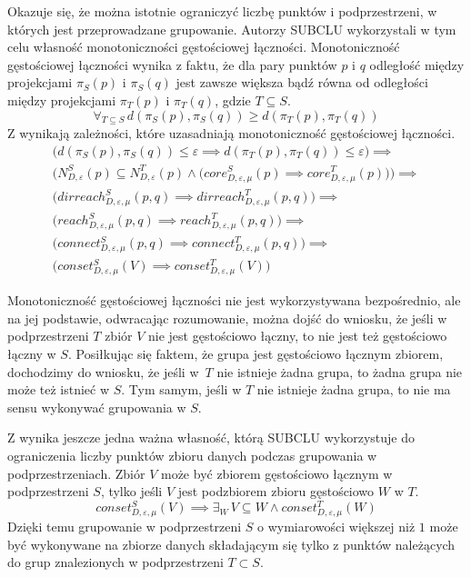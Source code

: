 Okazuje się, że można istotnie ograniczyć liczbę punktów i podprzestrzeni, w których jest przeprowadzane grupowanie. Autorzy SUBCLU wykorzystali w tym celu własność monotoniczności gęstościowej łączności. Monotoniczność gęstościowej łączności wynika z faktu, że dla pary punktów $ p $ i $ q $ odległość między projekcjami $ \pi_S(p) $ i $ \pi_S(q) $ jest zawsze większa bądź równa od odległości między projekcjami $ \pi_T(p) $ i $ \pi_T(q) $, gdzie $ T \subseteq S $. 
\begin{equation}\label{eq:d-vs-d-projected}
\forall_{T\subseteq S}\,d(\pi_S(p),\pi_S(q)) \geq d(\pi_T(p), \pi_T(q))
\end{equation}
Z  wynikają zależności, które uzasadniają monotoniczność gęstościowej łączności.
\begin{equation}
	\begin{array}{l}
		\big(d(\pi_S(p),\pi_S(q)) \le \varepsilon \implies d(\pi_T(p), \pi_T(q)) \le \varepsilon\big) \implies\\
		\big(N^S_{D,\varepsilon}(p) \subseteq N^T_{D,\varepsilon}(p) \land \big(core^S_{D,\varepsilon,\mu}(p) \implies core^T_{D,\varepsilon,\mu}(p)\big)\big) \implies \\
		\big(dirreach^S_{D,\varepsilon,\mu}(p, q) \implies dirreach^T_{D,\varepsilon,\mu}(p, q)\big) \implies \\
		\big(reach^S_{D,\varepsilon,\mu}(p, q) \implies reach^T_{D,\varepsilon,\mu}(p, q)\big) \implies \\
		\big(connect^S_{D,\varepsilon,\mu}(p, q) \implies connect^T_{D,\varepsilon,\mu}(p, q)\big) \implies \\
		\big(conset^S_{D,\varepsilon,\mu}(V) \implies conset^T_{D,\varepsilon,\mu}(V)\big)
	\end{array}
\end{equation}

Monotoniczność gęstościowej łączności nie jest wykorzystywana bezpośrednio, ale na jej podstawie, odwracając rozumowanie, można dojść do wniosku, że jeśli w podprzestrzeni $ T $ zbiór $ V $ nie jest gęstościowo łączny, to nie jest też gęstościowo łączny w $ S $. Posiłkując się faktem, że grupa jest gęstościowo łącznym zbiorem, dochodzimy do wniosku, że jeśli \mbox{w $ T $} nie istnieje żadna grupa, to żadna grupa nie może też istnieć w $ S $. Tym samym, jeśli w $ T $ nie istnieje żadna grupa, to nie ma sensu wykonywać grupowania w $ S $.

Z  wynika jeszcze jedna ważna własność, którą SUBCLU wykorzystuje do ograniczenia liczby punktów zbioru danych podczas grupowania w podprzestrzeniach. Zbiór $ V $ może być zbiorem gęstościowo łącznym w podprzestrzeni $ S $, tylko jeśli $ V $ jest podzbiorem zbioru gęstościowo  $ W $ w $ T $.
\begin{equation}
 conset^S_{D,\varepsilon,\mu}(V) \implies \exists_W\,V\subseteq W \land conset^T_{D,\varepsilon,\mu}(W)
\end{equation}
Dzięki temu grupowanie w podprzestrzeni $ S $ o wymiarowości większej niż $ 1 $ może być wykonywane na zbiorze danych składającym się tylko z punktów należących do grup znalezionych w podprzestrzeni $ T \subset S $.

